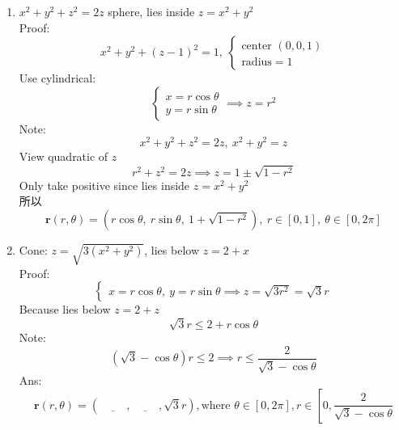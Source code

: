 \documentclass[../main.tex]{subfiles}
\begin{document}
\begin{itemize}
\begin{enumerate}
\item  $x^2+y^2+z^2=2z$ sphere, lies inside $z=x^2+y^2$\\
Proof: 
\begin{equation}
x^2+y^2+(z-1)^2=1,~\begin{cases}
\text{center } (0,0,1) \\
\text{radius} = 1
\end{cases}
\end{equation}
Use cylindrical:
\begin{equation}
\begin{cases}
x = r\cos \theta\\
y = r\sin\theta
\end{cases}\implies z = r^2
\end{equation}
Note:
\begin{equation}
x^2+y^2 +z^2 = 2z,~x^2+y^2 = z
\end{equation}
View quadratic of $z$
\begin{equation}
r^2 + z^2 = 2z \implies z = 1 \pm \sqrt{1-r^2}
\end{equation}
Only take positive since lies inside $z=x^2+y^2$\\
所以
\begin{equation}
\mathbf{r}(r,\theta) = (r\cos\theta,~r\sin\theta,~1+\sqrt{1-r^2}),~r\in[0,1],~\theta\in[0,2\pi]
\end{equation}
\item Cone: $z = \sqrt{3(x^2+y^2)}$, lies below
$z = 2+x$\\
Proof:
\begin{equation}
\begin{cases}
  x = r\cos\theta,~ y = r\sin\theta \implies
  z = \sqrt{3r^2} = \sqrt{3}r
\end{cases}
\end{equation}
Because lies below $z = 2+z$
\begin{equation}
\sqrt{3} r \leq 2 + r\cos\theta
\end{equation}
Note:
\begin{equation}
(\sqrt{3}-\cos\theta)r \leq 2 \implies r\leq\frac{2}{\sqrt{3}-\cos\theta}
\end{equation}
Ans:
\begin{equation}
\mathbf{r}(r,\theta) = \left(
\underline{\hspace{1cm}},\underline{\hspace{1cm}}, \sqrt{3}r
\right), \text{where }\theta \in[0,2\pi],r\in\left[
0, \frac{2}{\sqrt{3}-\cos\theta}

\end{equation}
\end{enumerate}
\end{itemize}
\end{document}
